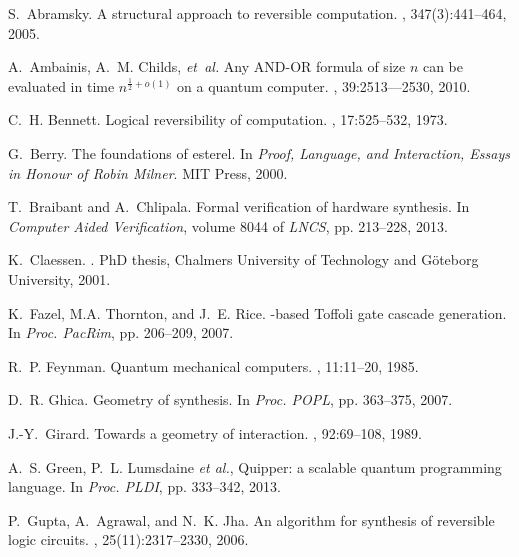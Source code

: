 \documentclass{article}
\theoremstyle{plain}
\theoremstyle{definition}
\begin{document}
\begin{thebibliography}{10}

S.~Abramsky.
\newblock A structural approach to reversible computation.
, 347(3):441--464, 2005.

A.~Ambainis, A.~M. Childs, {\em et~al.}
\newblock Any {AND}-{OR} formula of size $n$ can be evaluated in time
  $n^{\frac12+o(1)}$ on a quantum computer.
, 39:2513–--2530, 2010.

C.~H. Bennett.
\newblock Logical reversibility of computation.
, 17:525--532, 1973.

G.~Berry.
\newblock The foundations of esterel.
\newblock In {\em Proof, Language, and Interaction, Essays in Honour of Robin
  Milner}. MIT Press, 2000.

T.~Braibant and A.~Chlipala.
\newblock Formal verification of hardware synthesis.
\newblock In {\em Computer Aided Verification}, volume 8044 of {\em LNCS},
  pp. 213--228, 2013.

K.~Claessen.
.
\newblock PhD thesis, Chalmers University of Technology and G{\"o}teborg
  University, 2001.

K.~Fazel, M.A. Thornton, and J.~E. Rice.
-based {T}offoli gate cascade generation.
\newblock In {\em Proc. PacRim}, pp. 206--209, 2007.

R.~P. Feynman.
\newblock Quantum mechanical computers.
, 11:11--20, 1985.

D.~R. Ghica.
\newblock Geometry of synthesis.
\newblock In {\em Proc. POPL}, pp. 363--375, 2007.

J.-Y.~Girard.
\newblock Towards a geometry of interaction.
, 92:69--108, 1989.

A.~S. Green, P.~L. Lumsdaine {\em et al.},
\newblock Quipper: a scalable quantum programming language.
\newblock In {\em Proc. PLDI}, pp. 333--342, 2013.

P.~Gupta, A.~Agrawal, and N.~K. Jha.
\newblock An algorithm for synthesis of reversible logic circuits.
,
  25(11):2317--2330, 2006.


\end{thebibliography}
\end{document}
